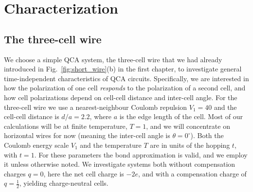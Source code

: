 \chapter{Characterization}
\graphicspath{{../gfx/chapter03/}{../plots/chapter03/}}


\section{The three-cell wire}

We choose a simple QCA system, the three-cell wire that we had already
introduced in Fig.~\ref{fig:short_wire}(b) in the first chapter, to investigate
general time-independent characteristics of QCA circuits. Specifically, we are
interested in how the polarization of one cell \emph{responds} to the
polarization of a second cell, and how cell polarizations depend on cell-cell
distance and inter-cell angle. For the three-cell wire we use a
nearest-neighbour Coulomb repulsion $V_1 = 40$ and the cell-cell distance is
$d/a = 2.2$, where $a$ is the edge length of the cell. Most of our calculations
will be at finite temperature, $T = 1$, and we will concentrate on horizontal
wires for now (meaning the inter-cell angle is $\theta = 0^{\circ}$). Both the
Coulomb energy scale $V_1$ and the temperature $T$ are in units of the hopping $t$,
with $t = 1$. For these parameters the bond approximation is valid, and we
employ it unless otherwise noted. We investigate systems both without compensation
charges $q = 0$, here the net cell charge is $-2e$, and with a compensation
charge of $q=\frac{1}{2}$, yielding charge-neutral cells.

